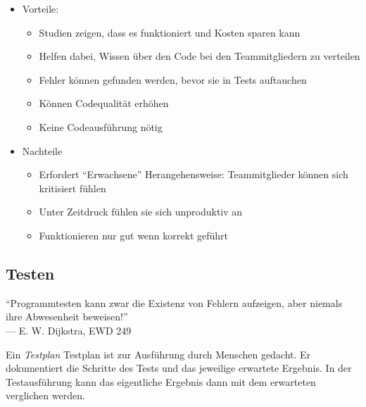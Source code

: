 \documentclass[ngerman,color=3b]{tuda_summary}
\begin{document}
\begin{itemize}
    \item Vorteile: \begin{itemize}
              \item Studien zeigen, dass es funktioniert und Kosten sparen kann
              \item Helfen dabei, Wissen über den Code bei den Teammitgliedern zu verteilen
              \item Fehler können gefunden werden, bevor sie in Tests auftauchen
              \item Können Codequalität erhöhen
              \item Keine Codeausführung nötig
          \end{itemize}
    \item Nachteile\begin{itemize}
              \item Erfordert \enquote{Erwachsene} Herangehensweise: Teammitglieder können sich kritisiert fühlen
              \item Unter Zeitdruck fühlen sie sich unproduktiv an
              \item Funktionieren nur gut wenn korrekt geführt
          \end{itemize}
\end{itemize}
\clearpage
\subsection{Testen}
\begin{defBox}
    \enquote{Programmtesten kann zwar die Existenz von Fehlern aufzeigen, aber niemals ihre Abwesenheit beweisen!}\mbox{}\\\mbox{}\hfill — E. W. Dijkstra, EWD 249
\end{defBox}
\begin{definition}[Testplan]
    Ein \textit{Testplan} Testplan ist zur Ausführung durch Menschen gedacht. Er dokumentiert die Schritte des Tests und das jeweilige erwartete Ergebnis. In der Testausführung kann das eigentliche Ergebnis dann mit dem erwarteten verglichen werden.
\end{definition}
\end{document}
